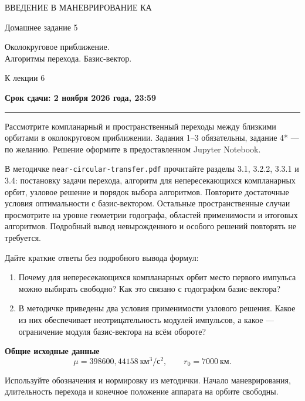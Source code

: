 \documentclass[11pt,a4paper]{article}
\newcommand{\taskheading}[2]{%
  \par\vspace{5pt}{\large\bfseries\color{accent}Задание #1. #2}\par\smallskip}
\begin{document}
{\small\color{accent}ВВЕДЕНИЕ В МАНЕВРИРОВАНИЕ КА}\par
\vspace{3pt}
{\huge Домашнее задание 5}\par
{\large Околокруговое приближение.\\Алгоритмы перехода. Базис-вектор.}\par
{\small\color{muted}К лекции 6}
\par{\small\bfseries\color{accent}Срок сдачи: 2 ноября 2026 года, 23:59}
\vspace{4pt}
{\color{rulecolor}\hrule}
\vspace{5pt}

Рассмотрите компланарный и пространственный переходы между близкими
орбитами в околокруговом приближении. Задания 1--3 обязательны,
задание 4* --- по желанию. Решение оформите в предоставленном Jupyter Notebook.

\taskheading{1}{Чтение методички}

В методичке \texttt{near-circular-transfer.pdf} прочитайте разделы
3.1, 3.2.2, 3.3.1 и 3.4: постановку задачи перехода, алгоритм для
непересекающихся компланарных орбит, узловое решение и порядок выбора алгоритмов.
Повторите достаточные условия оптимальности с базис-вектором.
Остальные пространственные случаи просмотрите на уровне геометрии
годографа, областей применимости и итоговых алгоритмов.
Подробный вывод невырожденного и особого решений повторять не требуется.

Дайте краткие ответы без подробного вывода формул:
\begin{enumerate}
\item Почему для непересекающихся компланарных орбит место первого импульса
можно выбирать свободно? Как это связано с годографом базис-вектора?
\item В методичке приведены два условия применимости узлового решения.
Какое из них обеспечивает неотрицательность модулей импульсов,
а какое --- ограничение модуля базис-вектора на всём обороте?
\end{enumerate}

\begingroup
\setlength{\fboxsep}{9pt}
\colorbox{tint}{\begin{minipage}{\dimexpr\linewidth-2\fboxsep\relax}
\textbf{Общие исходные данные}
\[
 \mu=398600{,}44158\ \text{км}^3/\text{с}^2,\qquad
 r_0=7000\ \text{км}.
\]
\end{minipage}}
\endgroup

Используйте обозначения и нормировку из методички.
Начало маневрирования, длительность перехода и конечное положение
аппарата на орбите свободны.
\end{document}
